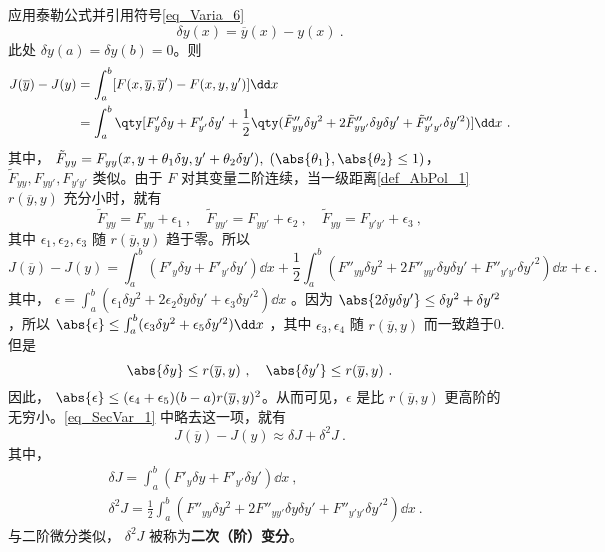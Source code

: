 应用泰勒公式并引用符号\autoref{eq_Varia_6}~
\begin{equation}
\delta y(x)=\overline{y}(x)-y(x)~.
\end{equation}
此处 $\delta y(a)=\delta y(b)=0$。则
\begin{equation}
\begin{aligned}
J(\overline{y})-J(y)&=\int_a^b[F(x,\overline{y},\overline{y}')-F(x,y,y')]\dd x\\
&=\int_a^b\qty[F'_y\delta y+F'_{y'}\delta y'+\frac{1}{2}\qty(\tilde{F}''_{yy}\delta y^2+2\tilde{F}''_{yy'}\delta y\delta y'+\tilde{F}''_{y'y'}\delta y'^2)]\dd x~.
\end{aligned}
\end{equation}
其中， $\tilde{F}_{yy}=F_{yy}(x,y+\theta_1\delta y,y'+\theta_2\delta y'),\;(\abs{\theta_1},\abs{\theta_2}\leq1)$，$\tilde{F}_{yy},F_{yy'},F_{y'y'}$ 类似。由于 $F$ 对其变量二阶连续，当一级距离\autoref{def_AbPol_1}~ $r(\overline{y},y)$ 充分小时，就有
\begin{equation}
\tilde F_{yy}=F_{yy}+\epsilon_1~,\quad \tilde F_{yy'}=F_{yy'}+\epsilon_2~,\quad \tilde F_{yy}=F_{y'y'}+\epsilon_3~,
\end{equation}
其中 $\epsilon_1,\epsilon_2,\epsilon_3$ 随 $r(\overline{y},y)$ 趋于零。所以
\begin{equation}\label{eq_SecVar_1}
J(\overline{y})-J(y)=\int_a^b(F'_y\delta y+F'_{y'}\delta y')\dd x+\frac{1}{2}\int_a^b(F''_{yy}\delta y^2+2F''_{yy'}\delta y\delta y'+F''_{y'y'}\delta y'^2)\dd x+\epsilon~.
\end{equation}
其中， $\epsilon=\int_a^b(\epsilon_1\delta y^2+2\epsilon_2\delta y\delta y'+\epsilon_3\delta y'^2)\dd x$
。因为 $\abs{2\delta y\delta y'}\leq \delta y^2+\delta y'^2$，所以 $\abs{\epsilon}\leq \int_a^b(\epsilon_3\delta y^2+\epsilon_5\delta y'^2)\dd x$ ，其中 $\epsilon_3,\epsilon_4$ 随 $r(\overline{y},y)$ 而一致趋于0.但是
\begin{equation}
\abs{\delta y}\leq r(\overline{y},y)~,\quad \abs{\delta y'}\leq r(\overline{y},y)~.
\end{equation}
因此， $\abs{\epsilon}\leq (\epsilon_4+\epsilon_5)(b-a)r(\overline{y},y)^2$。从而可见，$\epsilon$ 是比 $r(\overline{y},y)$ 更高阶的无穷小。\autoref{eq_SecVar_1} 中略去这一项，就有
\begin{equation}
J(\overline{y})-J(y)\approx\delta J+\delta^2J~.
\end{equation}
其中，
\begin{equation}
\begin{aligned}
&\delta J=\int_a^b(F'_y\delta y+F'_{y'}\delta y')\dd x~,\\
&\delta^2 J=\frac{1}{2}\int_a^b(F''_{yy}\delta y^2+2F''_{yy'}\delta y\delta y'+F''_{y'y'}\delta y'^2)\dd x~.
\end{aligned}
\end{equation}
与二阶微分类似， $\delta^2J$ 被称为\textbf{二次（阶）变分}。
